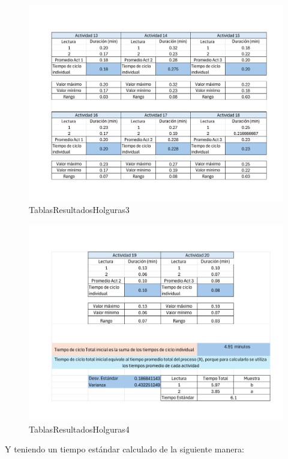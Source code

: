     \begin{figure}[H]
        \centering
        \includegraphics[scale=0.300]{21/img/tablasResultadosHolguras3.pdf}
        \caption{TablasResultadosHolguras3}
        \label{fig:tablasResultadosHolguras3}
    \end{figure}
    \begin{figure}[H]
        \centering
        \includegraphics[scale=0.300]{21/img/tablasResultadosHolguras4.pdf}
        \caption{TablasResultadosHolguras4}
        \label{fig:tablasResultadosHolguras4}
    \end{figure}
    
    Y teniendo un tiempo estándar calculado de la siguiente manera: 
    
